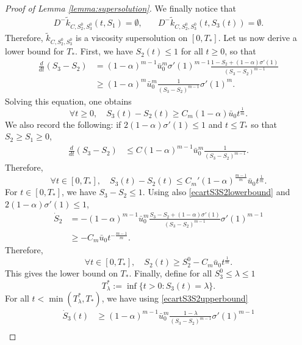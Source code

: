 \documentclass[11pt]{article}
\numberwithin{equation}{section} %
\newcommand{\al}{\alpha}
\begin{document}
\begin{proof}[Proof of Lemma \ref{lemma:supersolution}]
We finally notice that
\begin{align*}
     D^{-}\tilde k_{C,S_2^0,S_3^0}(t,S_1) = \emptyset, 
    & \quad D^{-}\tilde k_{C,S_2^0,S_3^0}(t,S_3(t)) = \emptyset.
\end{align*}
Therefore, $\tilde k_{C,S_2^0,S_3^0}$ is a viscosity supersolution on $[0,T_*]$. Let us now derive a lower bound for $T_*$. 
First, we have $S_2(t)\le 1$ for all $t\ge 0$, so that
\begin{align*}
    \frac{d}{dt}(S_3-S_2) &= (1-\al)^{m-1}\bar u_0^m  \sigma'(1)^{m-1} \frac{1-S_2 + (1-\al)\sigma'(1)}{(S_3-S_2)^{m-1}} \\
    &\ge (1-\al)^{m}\bar u_0^m \frac{1 }{(S_3-S_2)^{m-1}}\sigma'(1)^{m}.
\end{align*}
Solving this equation, one obtains
\begin{equation}\label{ecartS3S2lowerbound}
    \forall t\ge 0, \quad S_3(t)-S_2(t) \ge C_m(1-\al) \bar u_0 t^\frac{1}{m}.
\end{equation}
We also record the following: if $2(1-\al)\sigma'(1)\le 1$ and $t\le T_*$ so that $S_2\ge S_1\ge0$,
\begin{align*}
    \frac{d}{dt}(S_3-S_2) 
    &\le C(1-\al)^{m-1}\bar u_0^m  \frac{1}{(S_3-S_2)^{m-1}}.
\end{align*}
Therefore,
\begin{equation}\label{ecartS3S2upperbound}
   \forall t\in [0,T_*],\quad  S_3(t)-S_2(t)\le  C_m'(1-\al)^{\frac{m-1}{m}}\bar u_0 t^\frac{1}{m}.
\end{equation}
For $t\in [0,T_*]$, we have $S_3-S_2 \le 1$. Using also \eqref{ecartS3S2lowerbound} and $2(1-\al)\sigma'(1)\le 1$,
\begin{align*}
    \dot S_2 &= -(1-\al)^{m-1}\bar u_0^m \frac{S_3-S_2 + (1-\al)\sigma'(1) }{(S_3-S_2)^{m-1}}\sigma'(1)^{m-1} \\
    &\ge -C_m \bar u_0 t^{-\frac{m-1}{m}}.
\end{align*}
Therefore,
\begin{equation*}
   \forall t\in [0,T_*],\quad  S_2(t) \ge S_2^0 -C_m \bar u_0 t^\frac{1}{m}.
\end{equation*}
This gives the lower bound on $T_*$. Finally, define for all $S_3^0 \le \lambda \le 1$
\begin{equation*}
    T_\lambda^* := \inf\{t>0 : S_3(t) = \lambda\}.
\end{equation*}
For all $t< \min(T_\lambda^*, T_*)$, we have using \eqref{ecartS3S2upperbound}
\begin{align*}
    \dot S_3(t) &\ge (1-\al)^{m-1}\bar u_0^m \frac{1-\lambda }{(S_3-S_2)^{m-1}}\sigma'(1)^{m-1}\\

\end{align*}
\end{proof}
\end{document}
